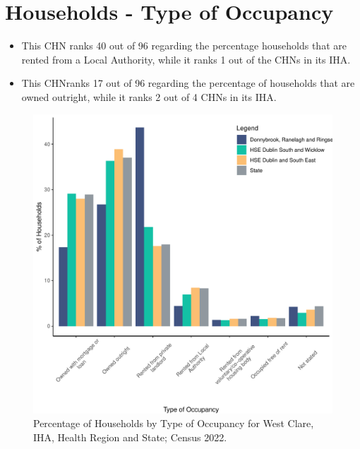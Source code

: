 \documentclass{article}
\begin{document}
\section{Households - Type of Occupancy}\label{sect:Households}
\begin{itemize}
\item This CHN ranks  40 out of 96 regarding the percentage households that are rented from a Local Authority, while it ranks  1 out of the CHNs in its IHA. 
\item This CHNranks  17 out of 96 regarding the percentage of households that are owned outright, while it ranks   2 out of 4 CHNs in its IHA.
\end{itemize}
\begin{figure}[H]
	\centering
	\includegraphics[width = 140mm]{../figures/HouseholdsED.pdf}
	\caption{Percentage of Households by Type of Occupancy for West Clare, IHA, Health Region and State; Census 2022.}
	\label{fig:vbnv}
	\end{figure}
\end{document}
